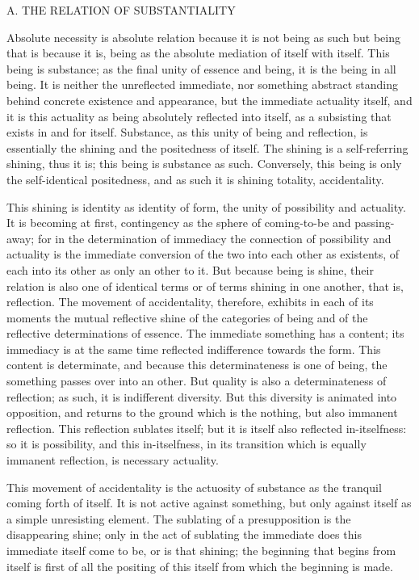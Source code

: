 A. THE RELATION OF SUBSTANTIALITY

Absolute necessity is absolute relation
because it is not being as such
but being that is because it is,
being as the absolute mediation
of itself with itself.
This being is substance;
as the final unity of essence and being,
it is the being in all being.
It is neither the unreflected immediate,
nor something abstract standing behind
concrete existence and appearance,
but the immediate actuality itself,
and it is this actuality
as being absolutely reflected into itself,
as a subsisting that exists in and for itself.
Substance, as this unity of being and reflection,
is essentially the shining and the positedness of itself.
The shining is a self-referring shining, thus it is;
this being is substance as such.
Conversely, this being is only the self-identical positedness,
and as such it is shining totality, accidentality.

This shining is identity as identity of form,
the unity of possibility and actuality.
It is becoming at first,
contingency as the sphere of
coming-to-be and passing-away;
for in the determination of immediacy
the connection of possibility and actuality is
the immediate conversion of the two
into each other as existents,
of each into its other as only an other to it.
But because being is shine,
their relation is also one of identical terms
or of terms shining in one another, that is, reflection.
The movement of accidentality, therefore,
exhibits in each of its moments the mutual
reflective shine of the categories of being
and of the reflective determinations of essence.
The immediate something has a content;
its immediacy is at the same time
reflected indifference towards the form.
This content is determinate,
and because this determinateness is one of being,
the something passes over into an other.
But quality is also a determinateness of reflection;
as such, it is indifferent diversity.
But this diversity is animated into opposition,
and returns to the ground which is the nothing,
but also immanent reflection.
This reflection sublates itself;
but it is itself also reflected in-itselfness:
so it is possibility, and this in-itselfness,
in its transition which is equally immanent reflection,
is necessary actuality.

This movement of accidentality is the actuosity of substance
as the tranquil coming forth of itself.
It is not active against something,
but only against itself as a simple unresisting element.
The sublating of a presupposition is the disappearing shine;
only in the act of sublating the immediate does this
immediate itself come to be, or is that shining;
the beginning that begins from itself is first of all
the positing of this itself from which the beginning is made.

